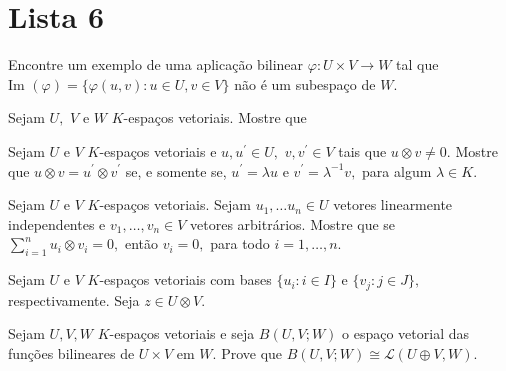 \documentclass[11pt,a4paper]{article}
\begin{document}
\section{\textcolor{Floresta}{Lista 6}}

\begin{exercicio}
Encontre um exemplo de uma aplicação bilinear $\varphi \colon U \times V \to W$ tal que $\mbox{Im }(\varphi) = \{\varphi(u, v) \colon u \in U, v \in V\}$ não é um subespaço de $W.$
\end{exercicio}
\solucao{
}
\begin{exercicio} Sejam $U,$ $V$ e $W$ $K$-espaços vetoriais. Mostre que
\end{exercicio}
\solucao{}
\begin{exercicio}
Sejam $U$ e $V$ $K$-espaços vetoriais e $u, u^{\prime} \in U,$ $v, v^{\prime} \in V$ tais que $u \otimes v \neq 0.$ Mostre que $u \otimes v = u^{\prime} \otimes v^{\prime}$ se, e somente se, $u^{\prime} = \lambda u$ e $v^{\prime} = \lambda^{-1}v,$ para algum $\lambda \in K.$
\end{exercicio}
\solucao{}
\begin{exercicio}
Sejam $U$ e $V$ $K$-espaços vetoriais. Sejam $u_1, \ldots u_n \in U$ vetores linearmente independentes e $v_1, \ldots, v_n \in V$ vetores arbitrários. Mostre que se $\sum\limits_{i=1}^n u_i \otimes v_i = 0,$ então $v_i = 0,$ para todo $i = 1, \ldots, n.$
\end{exercicio}
\solucao{}
\begin{exercicio}
Sejam $U$ e $V$ $K$-espaços vetoriais com bases $\{u_i : i \in I\}$ e $\{v_j : j \in J\},$ respectivamente. Seja $z \in U \otimes V.$
\end{exercicio}
\solucao{}
\begin{exercicio}
Sejam $U, V, W$ $K$-espaços vetoriais e seja $B(U, V; W)$ o espaço vetorial das funções bilineares de $U \times V$ em $W.$ Prove que $B(U, V; W) \cong \mathcal{L}(U \oplus V, W).$
\end{exercicio}
\end{document}

